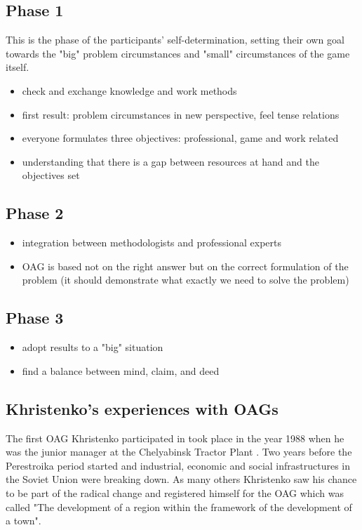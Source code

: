 \documentclass[a4paper,11pt]{article}
\begin{document}
\subsection{Phase 1}
This is the phase of the participants’ self-determination, setting their own
goal towards the "big" problem circumstances and "small" circumstances of the
game itself.
\begin{itemize}
\item check and exchange knowledge and work methods
\item first result: problem circumstances in new perspective, feel tense
  relations
\item everyone formulates three objectives: professional, game and work
  related
\item understanding that there is a gap between resources at hand and the
  objectives set 
\end{itemize}

\subsection{Phase 2}
\begin{itemize}
\item integration between methodologists and professional experts
\item OAG is based not on the right answer but on the correct formulation of
  the problem (it should demonstrate what exactly we need to solve the
  problem)
\end{itemize}

\subsection{Phase 3}
\begin{itemize}
\item adopt results to a "big" situation
\item find a balance between mind, claim, and deed
\end{itemize}

\subsection{Khristenko's experiences with OAGs}
The first OAG Khristenko participated in took place in the year 1988 when he
was the junior manager at the Chelyabinsk Tractor Plant \cite[p. 38\,ff]{5}.
Two years before the Perestroika period started and industrial, economic and
social infrastructures in the Soviet Union were breaking down. As many others
Khristenko saw his chance to be part of the radical change and registered
himself for the OAG which was called "The development of a region within the
framework of the development of a town".
\end{document}
